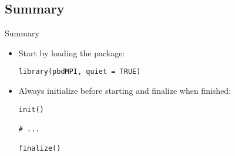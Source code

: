 \subsection{Summary}
\makesubcontentsslidessec


\begin{frame}[fragile]
  \begin{block}{Summary}\pause
    \begin{itemize}
      \item Start by loading the package:
\vspace{-.4cm}
\begin{lstlisting}
library(pbdMPI, quiet = TRUE)
\end{lstlisting}
      \item Always initialize before starting and finalize when finished:
\vspace{-.4cm}
\begin{lstlisting}
init()

# ...

finalize()
\end{lstlisting}
\end{itemize}
\end{block}
\end{frame}